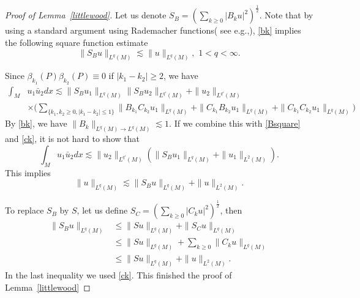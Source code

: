 \documentclass[10pt]{amsart}
\newcommand{\1}{{\bf 1}}
\begin{document}
\begin{proof}[Proof of Lemma~\ref{littlewood}]
    Let us denote $S_B=\left(\sum_{k\ge0} |B_ku|^2\right)^{\frac12}$. Note that by using a standard argument using Rademacher functions( see e.g.,\cite[§ 0]{SFIO2}), \eqref{bk} implies the following square function estimate
    \begin{equation}\label{Bsquare}
            \|S_Bu\|_{L^q(M)}\lesssim  \|u\|_{L^q(M)},\,\, 1<q<\infty.
    \end{equation}
    
    
    
    
    Since  $\beta_{k_1}(P)\beta_{k_2}(P)\equiv 0$ if $|k_1-k_2|\ge 2$, we have 
    \begin{equation}\label{lia}
        \begin{aligned}
          \int_M &u_1 \bar u_2 dx\lesssim \|S_B u_1\|_{L^q(M)}\|S_B u_2\|_{L^{q'}(M)} 
            +\| u_2\|_{L^{q'}(M)}
            \\
             &\times \big(\sum_{\{k_1, k_2\ge 0, |k_1-k_2|\le 1\}}   \|B_{k_1}C_{k_2} u_1\|_{L^{q}(M)}+\|C_{k_1}B_{k_2} u_1\|_{L^{q}(M)}+\|C_{k_1}C_{k_2} u_1\|_{L^{q}(M)}\big)
        \end{aligned}
    \end{equation}
  By \eqref{bk}, we have $\|B_k\|_{L^{q}(M)\to L^{q}(M) }\lesssim1$. If we combine this with \eqref{Bsquare} and \eqref{ck}, it is not hard to show that 
  \begin{equation}
              \int_M u_1 \bar u_2 dx\lesssim \| u_2\|_{L^{q'}(M)}(\|S_B u_1\|_{L^{q}(M)}
           +\|u_1\|_{L^{2}(M)}).
  \end{equation}
This implies 
  \begin{equation}\label{liaa}
              \| u\|_{L^{q}(M)}\lesssim\|S_B u\|_{L^{q}(M)}
           +\|u\|_{L^{2}(M)}.
  \end{equation}
  
  To replace $S_B$ by $S$, let us define $S_C=\left(\sum_{k\ge0} |C_ku|^2\right)^{\frac12}$, then 
  \begin{equation}\label{lib}
      \begin{aligned}
          \|S_B u\|_{L^{q}(M)}&\le \|Su\|_{L^{q}(M)}+\|S_C u\|_{L^{q}(M)}\\
          &\le \|Su\|_{L^{q}(M)}+\sum_{k\ge 0}\|C_k u\|_{L^{q}(M)} \\
          &\le \|Su\|_{L^{q}(M)}+\| u\|_{L^{2}(M)}. 
      \end{aligned}
  \end{equation}
  In the last inequality we used \eqref{ck}. This finished the proof of Lemma~\ref{littlewood}
\end{proof}
\end{document}
